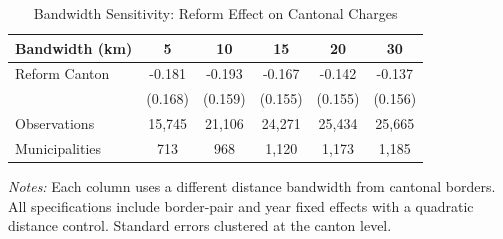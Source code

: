 \begin{table}[htbp]
\centering
\caption{Bandwidth Sensitivity: Reform Effect on Cantonal Charges}
\label{tab:bandwidth}
\begin{tabular}{lccccc}
\toprule
Bandwidth (km) & 5 & 10 & 15 & 20 & 30 \\
\midrule
Reform Canton & -0.181 & -0.193 & -0.167 & -0.142 & -0.137 \\
 & (0.168) & (0.159) & (0.155) & (0.155) & (0.156) \\
\midrule
Observations & 15,745 & 21,106 & 24,271 & 25,434 & 25,665 \\
Municipalities & 713 & 968 & 1,120 & 1,173 & 1,185 \\
\bottomrule
\end{tabular}
\begin{tablenotes}[flushleft]
\small
\item \textit{Notes:} Each column uses a different distance bandwidth from cantonal borders. All specifications include border-pair and year fixed effects with a quadratic distance control. Standard errors clustered at the canton level.
\end{tablenotes}
\end{table}
